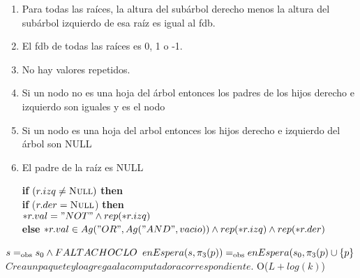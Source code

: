 \begin{enumerate}
	\item Para todas las raíces, la altura del subárbol derecho menos la altura del subárbol izquierdo de esa raíz es igual al fdb.
	\item El fdb de todas las raíces es 0, 1 o -1.
	\item No hay valores repetidos.
	\item Si un nodo no es una hoja del árbol entonces los padres de los hijos derecho e izquierdo son iguales y es el nodo
	\item Si un nodo es una hoja del arbol entonces los hijos derecho e izquierdo del árbol son NULL
	\item El padre de la raíz es NULL

		 \textbf{if} $(r.izq \neq \textsc{Null})$ \textbf{then} \\
		\textbf{if} ($r.der = \textsc{Null}$) \textbf{then} \\
		$*r.val = "NOT" \land rep(*r.izq)$ \\
		\textbf{else} $*r.val \in Ag("OR", Ag("AND",vacio)) \land rep(*r.izq) \land rep(*r.der)$
		\end{enumerate}






 {$s =_{\mathrm{obs}} s_0 \land FALTA CHOCLO$}
 {$enEspera(s,\pi_3(p)) =_{\mathrm{obs}} enEspera(s_0,\pi_3(p) \cup \{p\}$}
 {$Crea un paquete y lo agrega a la computadora correspondiente.$}
 {O($L + log(k)$)}


